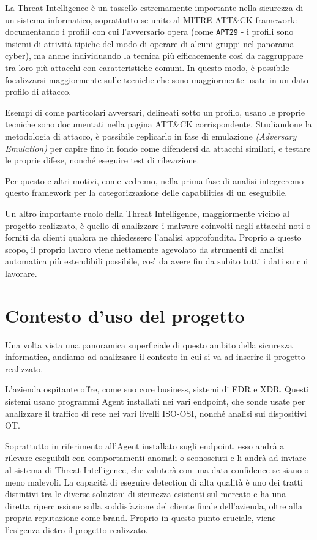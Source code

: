 La Threat Intelligence è un tassello estremamente importante nella sicurezza di un sistema informatico, soprattutto se unito al MITRE ATT\&CK framework: documentando i profili con cui l'avversario opera (come \texttt{APT29} - i profili sono insiemi di attività tipiche del modo di operare di alcuni gruppi nel panorama cyber), ma anche individuando la tecnica più efficacemente così da raggruppare tra loro più attacchi con caratteristiche comuni.
In questo modo, è possibile focalizzarsi maggiormente sulle tecniche che sono maggiormente usate in un dato profilo di attacco.

Esempi di come particolari avversari, delineati sotto un profilo, usano le proprie tecniche sono documentati nella pagina ATT\&CK corrispondente.
Studiandone la metodologia di attacco, è possibile replicarlo in fase di emulazione \emph{(Adversary Emulation)} per capire fino in fondo come difendersi da attacchi similari, e testare le proprie difese, nonché eseguire test di rilevazione.

Per questo e altri motivi, come vedremo, nella prima fase di analisi integreremo questo framework per la categorizzazione delle capabilities di un eseguibile.

\medskip

Un altro importante ruolo della Threat Intelligence, maggiormente vicino al progetto realizzato, è quello di analizzare i malware coinvolti negli attacchi noti o forniti da clienti qualora ne chiedessero l'analisi approfondita. Proprio a questo scopo, il proprio lavoro viene nettamente agevolato da strumenti di analisi automatica più estendibili possibile, così da avere fin da subito tutti i dati su cui lavorare.

\section{Contesto d'uso del progetto}
Una volta vista una panoramica superficiale di questo ambito della sicurezza informatica,
andiamo ad analizzare il contesto in cui si va ad inserire il progetto realizzato.

L'azienda ospitante offre, come suo core business, sistemi di EDR e XDR.
Questi sistemi usano programmi Agent installati nei vari endpoint, che sonde usate per analizzare il traffico di rete nei vari livelli ISO-OSI, nonché analisi sui dispositivi OT.

Soprattutto in riferimento all'Agent installato sugli endpoint, esso andrà a rilevare eseguibili con comportamenti anomali o sconosciuti e li andrà ad inviare al sistema di Threat Intelligence, che valuterà con una data confidence se siano o meno malevoli.
La capacità di eseguire detection di alta qualità è uno dei tratti distintivi tra le diverse soluzioni di sicurezza esistenti sul mercato e ha una diretta ripercussione sulla soddisfazione del cliente finale dell'azienda, oltre alla propria reputazione come brand.
Proprio in questo punto cruciale, viene l'esigenza dietro il progetto realizzato.

